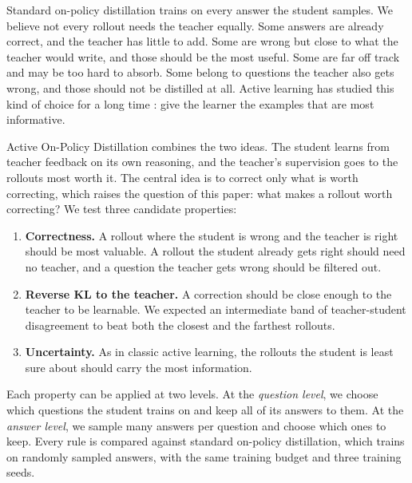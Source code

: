 \documentclass[11pt]{article}
\begin{document}
Standard on-policy distillation trains on every answer the student samples.
We believe not every rollout needs the teacher equally.
Some answers are already correct, and the teacher has little to add.
Some are wrong but close to what the teacher would write, and those should be the most useful.
Some are far off track and may be too hard to absorb.
Some belong to questions the teacher also gets wrong, and those should not be distilled at all.
Active learning has studied this kind of choice for a long time \citep{settles2009active}: give the learner the examples that are most informative.

Active On-Policy Distillation combines the two ideas.
The student learns from teacher feedback on its own reasoning, and the teacher's supervision goes to the rollouts most worth it.
The central idea is to correct only what is worth correcting, which raises the question of this paper: what makes a rollout worth correcting?
We test three candidate properties:
\begin{enumerate}
\item \textbf{Correctness.} A rollout where the student is wrong and the teacher is right should be most valuable. A rollout the student already gets right should need no teacher, and a question the teacher gets wrong should be filtered out.
\item \textbf{Reverse KL to the teacher.} A correction should be close enough to the teacher to be learnable. We expected an intermediate band of teacher-student disagreement to beat both the closest and the farthest rollouts.
\item \textbf{Uncertainty.} As in classic active learning, the rollouts the student is least sure about should carry the most information.
\end{enumerate}
Each property can be applied at two levels.
At the \emph{question level}, we choose which questions the student trains on and keep all of its answers to them.
At the \emph{answer level}, we sample many answers per question and choose which ones to keep.
Every rule is compared against standard on-policy distillation, which trains on randomly sampled answers, with the same training budget and three training seeds.
\end{document}
